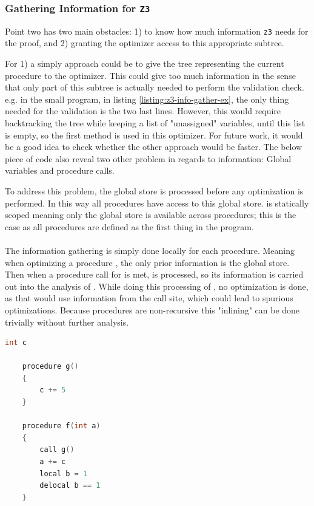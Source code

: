 \subsubsection{Gathering Information for \texttt{Z3} \ms}
Point two has two main obstacles: 1) to know how much information \texttt{z3} needs for the proof,
and 2) granting the optimizer access to this appropriate subtree.

For 1) a simply approach could be to give the tree representing the current procedure to the
optimizer. This could give too much information in the sense that only part of this subtree is
actually needed to perform the validation check. e.g. in the small program, in listing
\ref{listing:z3-info-gather-ex}, the only thing
needed for the validation is the two last lines. However, this would require backtracking the
tree while keeping a list of "unassigned" variables, until this list is empty, so the first
method is used in this optimizer. For future work, it would be a good idea to check whether the
other approach would be faster. The below piece of code also reveal two other problem in regards
to information: Global variables and procedure calls.

To address this problem, the global store is processed before any optimization is performed.
In this way all procedures have access to this global store. \lan is statically scoped meaning
only the global store is available across procedures; this is the case as all procedures are
defined as the first thing in the program.
\\
\\
The information gathering is simply done locally for each procedure. Meaning when optimizing
a procedure , the only prior information is the global store. Then when a procedure
call for  is met,  is processed, so its information is carried out into
the analysis of . While doing this processing of , no optimization is done,
as that would use information from the call site, which could lead to spurious optimizations.
Because procedures are non-recursive this "inlining" can be done trivially without further
analysis.

\begin{lstlisting}[language=C++, label=listing:z3-info-gather-ex,
    caption=Example on gathering information for \texttt{z3} where only last two lines are needed.]
    int c

    procedure g()
    {
        c += 5
    }

    procedure f(int a)
    {
        call g()
        a += c
        local b = 1
        delocal b == 1
    }
\end{lstlisting}

